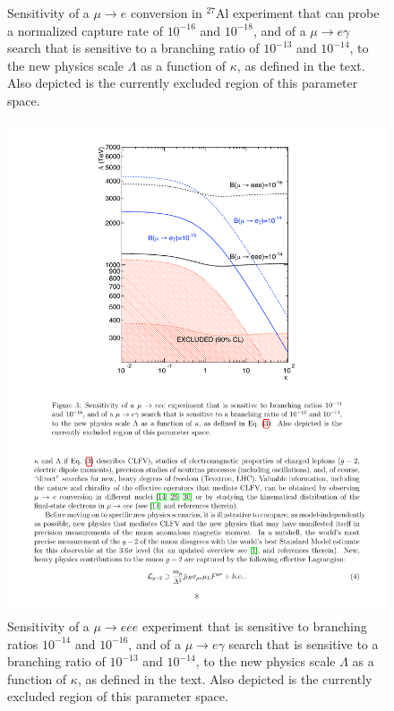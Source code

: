 \begin{figure}[ht]
\begin{minipage}[b]{0.48\linewidth}
  \caption{{Sensitivity of a $\mu\to e$ conversion in $^{27}$Al experiment that can probe a normalized capture 
rate of $10^{−16}$ and $10^{−18}$, and of a $\mu \to e \gamma$ search that is sensitive to a branching ratio of $10^{−13}$ and 
$10^{−14}$, to the new physics scale $\Lambda$ as a function of $\kappa$, as defined in the text. Also depicted is the 
currently excluded region of this parameter space.
}}
\label{fig:cl:p7}
\end{minipage}
\hspace{0.3cm}
\begin{minipage}[b]{0.48\linewidth}
\centering
    \includegraphics[trim = 45mm 130mm 50mm 10mm, clip, width=\linewidth]{ChargedLeptons/Figures/Page8.pdf}
  \caption{{Sensitivity of a $\mu \to eee$ experiment that is sensitive to branching ratios $10^{−14}$ and 
$10^{−16}$, and of a $\mu \to e \gamma$ search that is sensitive to a branching ratio of $10^{−13}$ and $10^{−14}$, to the new 
physics scale $\Lambda$ as a function of $\kappa$, as defined in the text.  Also depicted is the
currently excluded region of this parameter space.
}}
  \label{fig:cl:p8}
\end{minipage}
\end{figure}

